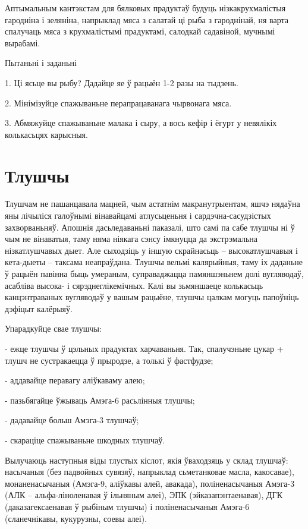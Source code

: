Аптымальным кантэкстам для бялковых прадуктаў будуць нізкакрухмалістыя гародніна і зеляніна, напрыклад мяса з салатай ці рыба з гароднінай, ня варта спалучаць мяса з крухмалістымі прадуктамі, салодкай садавіной, мучнымі вырабамі.

Пытаньні і заданьні

1. Ці ясьце вы рыбу? Дадайце яе ў рацыён 1-2 разы на тыдзень.

2. Мінімізуйце спажываньне перапрацаванага чырвонага мяса.

3. Абмяжуйце спажываньне малака і сыру, а вось кефір і ёгурт у невялікіх колькасьцях карысныя.


\section{Тлушчы}

Тлушчам не пашанцавала мацней, чым астатнім макранутрыентам, яшчэ нядаўна яны лічыліся галоўнымі вінавайцамі атлусьценьня і сардэчна-сасудзістых захворваньняў. Апошнія дасьледаваньні паказалі, што самі па сабе тлушчы ні ў чым не вінаватыя, таму няма ніякага сэнсу імкнуцца да экстрэмальна нізкатлушчавых дыет. Але сыходзіць у іншую скрайнасьць – высокатлушчавыя і кета-дыеты – таксама неапраўдана. Тлушчы вельмі калярыйныя, таму іх даданьне ў рацыён павінна быць умераным, суправаджацца памяншэньнем долі вугляводаў, асабліва высока- і сярэднеглікемічных. Калі вы зьмяншаеце колькасьць канцэнтраваных вугляводаў у вашым рацыёне, тлушчы цалкам могуць папоўніць дэфіцыт калёрыяў.

Упарадкуйце свае тлушчы:

- ежце тлушчы ў цэльных прадуктах харчаваньня. Так, спалучэньне цукар + тлушч не сустракаецца ў прыродзе, а толькі ў фастфудзе;

- аддавайце перавагу аліўкаваму алею;

- пазьбягайце ўжываць Амэга-6 расьлінныя тлушчы;

- дадавайце больш Амэга-3 тлушчаў;

- скараціце спажываньне шкодных тлушчаў.

Вылучаюць наступныя віды тлустых кіслот, якія ўваходзяць у склад тлушчаў: насычаныя (без падвойных сувязяў, напрыклад сьметанковае масла, какосавае), монаненасычаныя (Амэга-9, аліўкавы алей, авакада), поліненасычаныя Амэга-3 (АЛК – альфа-ліноленавая ў ільняным алеі), ЭПК (эйказапэнтаенавая), ДГК (даказагексаенавая ў рыбіным тлушчы) і поліненасычаныя Амэга-6 (сланечнікавы, кукурузны, соевы алеі).

